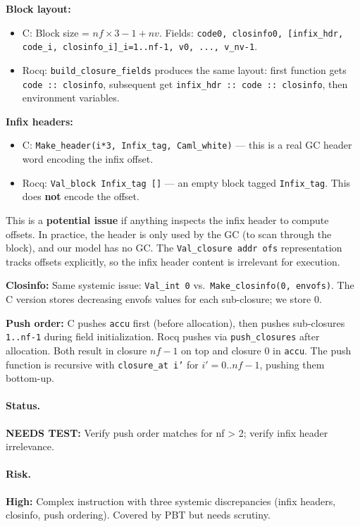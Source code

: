 \documentclass[11pt,a4paper]{article}
\newcommand{\statusneedstest}[1]{\textbf{\textcolor{orange!80!black}{NEEDS TEST:}} #1\xspace}
\newcommand{\riskhigh}[1]{\textcolor{red!70!black}{\textbf{High:}} #1\xspace}
\begin{document}
\textbf{Block layout:}
\begin{itemize}
  \item C: Block size = $nf \times 3 - 1 + nv$.  Fields: \texttt{code0, closinfo0,
    [infix\_hdr, code\_i, closinfo\_i]\_{i=1..nf-1}, v0, ..., v\_{nv-1}}.
  \item Rocq: \texttt{build\_closure\_fields} produces the same layout:
    first function gets \texttt{code :: closinfo}, subsequent get
    \texttt{infix\_hdr :: code :: closinfo}, then environment variables.
\end{itemize}

\textbf{Infix headers:}
\begin{itemize}
  \item C: \texttt{Make\_header(i*3, Infix\_tag, Caml\_white)} --- this is a
    real GC header word encoding the infix offset.
  \item Rocq: \texttt{Val\_block Infix\_tag []} --- an empty block tagged
    \texttt{Infix\_tag}.  This does \textbf{not} encode the offset.
\end{itemize}

This is a \textbf{potential issue} if anything inspects the infix header to
compute offsets.  In practice, the header is only used by the GC (to scan
through the block), and our model has no GC.  The \texttt{Val\_closure addr ofs}
representation tracks offsets explicitly, so the infix header content is irrelevant
for execution.

\textbf{Closinfo:}  Same systemic issue: \texttt{Val\_int 0} vs.\
\texttt{Make\_closinfo(0, envofs)}.  The C version stores decreasing envofs
values for each sub-closure; we store 0.

\textbf{Push order:}  C pushes \texttt{accu} first (before allocation),
then pushes sub-closures \texttt{1..nf-1} during field initialization.
Rocq pushes via \texttt{push\_closures} after allocation.  Both result in
closure $nf-1$ on top and closure 0 in \texttt{accu}.  The push
function is recursive with \texttt{closure\_at i'} for $i' = 0..nf-1$,
pushing them bottom-up.

\paragraph{Status.} \statusneedstest{Verify push order matches for nf > 2; verify infix header irrelevance.}

\paragraph{Risk.} \riskhigh{Complex instruction with three systemic discrepancies (infix headers, closinfo, push ordering).  Covered by PBT but needs scrutiny.}
\fi
\end{document}
